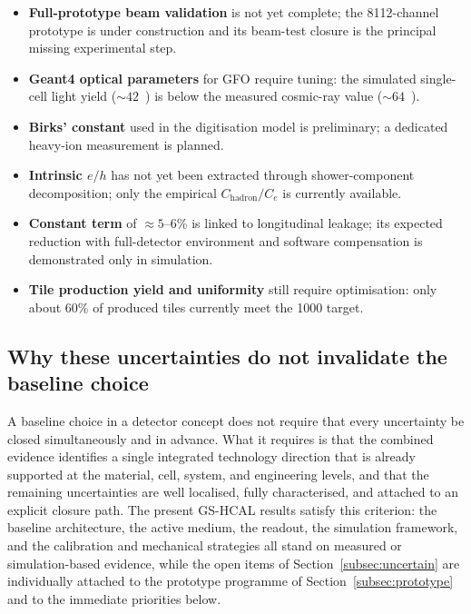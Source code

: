 \begin{itemize}
\item \textbf{Full-prototype beam validation} is not yet complete; the
  8112-channel prototype is under construction and its beam-test
  closure is the principal missing experimental step.
\item \textbf{Geant4 optical parameters} for GFO require tuning: the
  simulated single-cell light yield (${\sim}42$~\peMIP) is below the
  measured cosmic-ray value (${\sim}64$~\peMIP).
\item \textbf{Birks' constant} used in the digitisation model is
  preliminary; a dedicated heavy-ion measurement is planned.
\item \textbf{Intrinsic $e/h$} has not yet been extracted through
  shower-component decomposition; only the empirical
  $C_{\mathrm{hadron}}/C_{e}$ is currently available.
\item \textbf{Constant term} of ${\approx}5$--6\% is linked to
  longitudinal leakage; its expected reduction with full-detector
  environment and software compensation is demonstrated only in
  simulation.
\item \textbf{Tile production yield and uniformity} still require
  optimisation: only about 60\% of produced tiles currently meet the
  \SI{1000}{\phMeV} target.
\end{itemize}

\subsection{Why these uncertainties do not invalidate the baseline
choice}
\label{subsec:rationale-uncertainty}

A baseline choice in a detector concept does not require that every
uncertainty be closed simultaneously and in advance.
What it requires is that the combined evidence identifies a single
integrated technology direction that is already supported at the
material, cell, system, and engineering levels, and that the
remaining uncertainties are well localised, fully characterised,
and attached to an explicit closure path.
The present GS-HCAL results satisfy this criterion: the baseline
architecture, the active medium, the readout, the simulation
framework, and the calibration and mechanical strategies all stand on
measured or simulation-based evidence, while the open items of
Section~\ref{subsec:uncertain} are individually attached to the
prototype programme of Section~\ref{subsec:prototype} and to the
immediate priorities below.

